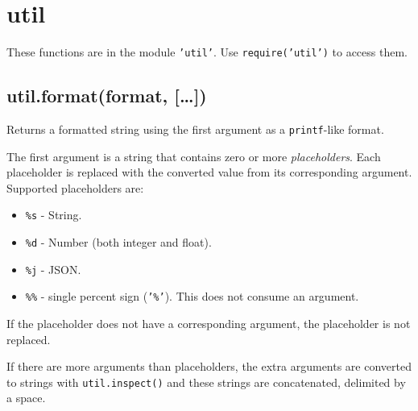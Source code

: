 \section{util}

\begin{Shaded}
\begin{Highlighting}[]
\NormalTok{: } 
\end{Highlighting}
\end{Shaded}

These functions are in the module \texttt{'util'}. Use
\texttt{require('util')} to access them.

\subsection{util.format(format, {[}\ldots{}{]})}

Returns a formatted string using the first argument as a
\texttt{printf}-like format.

The first argument is a string that contains zero or more
\emph{placeholders}. Each placeholder is replaced with the converted
value from its corresponding argument. Supported placeholders are:

\begin{itemize}
\item
  \texttt{\%s} - String.
\item
  \texttt{\%d} - Number (both integer and float).
\item
  \texttt{\%j} - JSON.
\item
  \texttt{\%\%} - single percent sign (\texttt{'\%'}). This does not
  consume an argument.
\end{itemize}

If the placeholder does not have a corresponding argument, the
placeholder is not replaced.

\begin{Shaded}
\end{Shaded}

If there are more arguments than placeholders, the extra arguments are
converted to strings with \texttt{util.inspect()} and these strings are
concatenated, delimited by a space.

